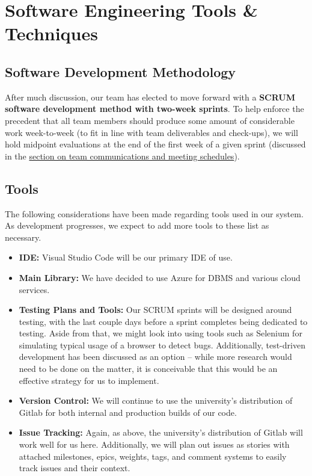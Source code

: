 

\setlststylejs





\newpage

\section{Software Engineering Tools \& Techniques}

\subsection{Software Development Methodology}

After much discussion, our team has elected to move forward with a \textbf{SCRUM software development method with two-week sprints}. To help enforce the precedent that all team members should produce some amount of considerable work week-to-week (to fit in line with team deliverables and check-ups), we will hold midpoint evaluations at the end of the first week of a given sprint (discussed in the \href{sec:team_comm_meeting}{section on team communications and meeting schedules}).

\subsection{Tools}

The following considerations have been made regarding tools used in our system. As development progresses, we expect to add more tools to these list as necessary.

\medskip

\begin{itemize}[nosep]
    \item \textbf{IDE:} Visual Studio Code will be our primary IDE of use.
    \item \textbf{Main Library:} We have decided to use Azure for DBMS and various cloud services.
    \item \textbf{Testing Plans and Tools:} Our SCRUM sprints will be designed around testing, with the last couple days before a sprint completes being dedicated to testing. Aside from that, we might look into using tools such as Selenium for simulating typical usage of a browser to detect bugs. Additionally, test-driven development has been discussed as an option -- while more research would need to be done on the matter, it is conceivable that this would be an effective strategy for us to implement.
    \item \textbf{Version Control:} We will continue to use the university's distribution of Gitlab for both internal and production builds of our code.
    \item \textbf{Issue Tracking:} Again, as above, the university's distribution of Gitlab will work well for us here. Additionally, we will plan out issues as stories with attached milestones, epics, weights, tags, and comment systems to easily track issues and their context.
\end{itemize}

